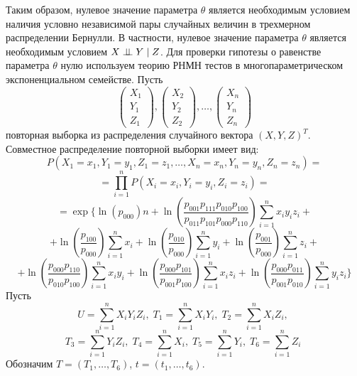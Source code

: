     Таким образом, нулевое значение параметра
    $\theta$ является необходимым условием наличия условно независимой пары
    случайных величин в трехмерном распределении Бернулли.
    В частности, нулевое значение параметра $\theta$
    является необходимым условием $X \perp\!\!\!\perp Y \mid Z$.
    Для проверки гипотезы о равенстве параметра $\theta$ нулю используем 
    теорию РНМН тестов \cite{Lehmann1986} в многопараметрическом 
    экспоненциальном семействе. Пусть
    $$
        \begin{pmatrix}
            X_1 \\
            Y_1 \\
            Z_1
        \end{pmatrix},
        \begin{pmatrix}
            X_2 \\
            Y_2 \\
            Z_2
        \end{pmatrix}, \ldots,
        \begin{pmatrix}
            X_n \\
            Y_n \\
            Z_n
        \end{pmatrix}
    $$ повторная выборка из распределения случайного вектора $(X,Y,Z)^T$.
    Совместное распределение повторной выборки имеет вид:
    $$
    P(X_1=x_1,Y_1=y_1,Z_1=z_1,\ldots,X_n=x_n,Y_n=y_n,Z_n=z_n)=
    $$
    $$
    =\prod_{i=1}^n P(X_i=x_i,Y_i=y_i,Z_i=z_i) =
    $$
    \newpage
    $$
     =\exp \Biggl\{\ln(p_{000})n + \ln  \left(\dfrac{p_{001}p_{111}p_{010}p_{100}}{p_{011}p_{101}p_{000}p_{110}}\right) \sum_{i=1}^n x_i y_i z_i +
     $$
        $$ +
            \ln\left(\dfrac{p_{100}}{p_{000}}\right) \sum_{i=1}^{n} x_i + \ln\left(\dfrac{p_{010}}{p_{000}}\right) \sum_{i=1}^{n} y_i +
            \ln\left(\dfrac{p_{001}}{p_{000}}\right) \sum_{i=1}^{n} z_i +
        $$
        $$
            +\ln \left(\dfrac{p_{000}p_{110}}{p_{010}p_{100}}\right) \sum_{i=1}^n x_i y_i +
            \ln \left(\dfrac{p_{000}p_{101}}{p_{001}p_{100}}\right) \sum_{i=1}^n x_i z_i +
            \ln \left(\dfrac{p_{000}p_{011}}{p_{001}p_{010}}\right) \sum_{i=1}^n y_i z_i \Biggr\}
        $$
    Пусть 
    $$
        U = \sum_{i=1}^n X_i Y_i Z_i, \;
        T_1 = \sum_{i=1}^n X_i Y_i, \;
        T_2 = \sum_{i=1}^n X_i Z_i, \;
    $$
    $$
        T_3 = \sum_{i=1}^n Y_i Z_i, \;
        T_4 = \sum_{i=1}^n X_i, \;
        T_5 = \sum_{i=1}^n Y_i, \;
        T_6 = \sum_{i=1}^n Z_i \;
    $$
    Обозначим $T=(T_1,\ldots,T_6)$, $t=(t_1,\ldots,t_6)$.
